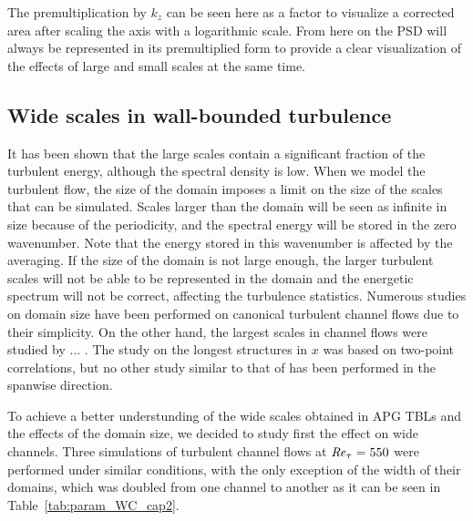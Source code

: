 The premultiplication by $k_z$ can be seen here as a factor to visualize a corrected area after scaling the axis with a logarithmic scale.
From here on the PSD will always be represented in its premultiplied form to provide a clear visualization of the effects of large and small scales at the same time.

\subsection{Wide scales in wall-bounded turbulence}
It has been shown that the large scales contain a significant fraction of the turbulent energy, although the spectral density is low.
When we model the turbulent flow, the size of the domain imposes a limit on the size of the scales that can be simulated. 
Scales larger than the domain will be seen as infinite in size because of the periodicity, and the spectral energy will be stored in the zero wavenumber. Note that the energy stored in this wavenumber is affected by the averaging.
If the size of the domain is not large enough, the larger turbulent scales will not be able to be represented in the domain and the energetic spectrum will not be correct, affecting the turbulence statistics.
Numerous studies on domain size have been performed on canonical turbulent channel flows due to their simplicity.
On the other hand, the largest scales in channel flows were studied by ...
.
The study on the longest structures in $x$ was based on two-point correlations, but no other study similar to that of  has been performed in the spanwise direction.

To achieve a better understunding of the wide scales obtained in APG TBLs and the effects of the domain size, we decided to study first the effect on wide channels.
Three simulations of turbulent channel flows at $\mbox{\textit{Re}}_{\tau} = 550 $ were performed under similar conditions, with the only exception of the width of their domains, which was doubled from one channel to another as it can be seen in Table~\ref{tab:param_WC_cap2}.
 
